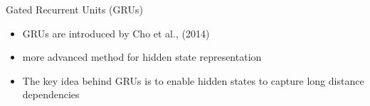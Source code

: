 \begin{frame}{Gated Recurrent Units (GRUs)}
    \begin{itemize}
        \item GRUs are introduced by Cho et al., (2014)
        \item more advanced method for hidden state representation
        \item The key idea behind GRUs is to enable hidden states to capture long distance dependencies
    \end{itemize}
\end{frame}
